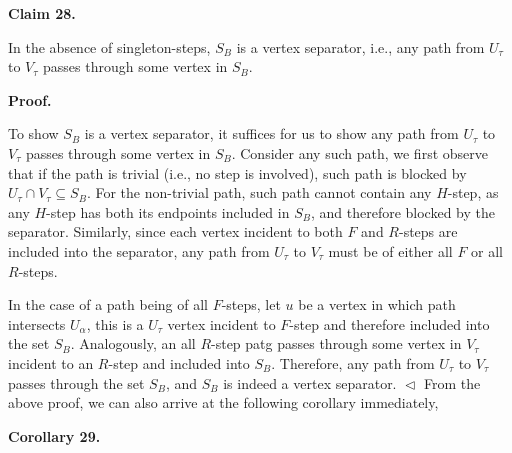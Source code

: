 

\par\medskip\noindent\textbf{
Claim 28. 
}\par



In the absence of singleton-steps, $S_{B}$ is a vertex separator, i.e., any path from $U_{\tau}$ to $V_{\tau}$ passes through some vertex in $S_{B}$.\par






\par\medskip\noindent\textbf{
\textbf{Proof}.}\par




To show $S_{B}$ is a vertex separator, it suffices for us to show any path from $U_{\tau}$ to $V_{\tau}$ passes through some vertex in $S_{B}$.
Consider any such path, we first observe that if the path is trivial (i.e., no step is involved), such path is blocked by $U_{\tau}\cap V_{\tau}\subseteq S_{B}$. For the non-trivial path, such path cannot contain any $H$-step, as any $H$-step has both its endpoints included in $S_{B}$, and therefore blocked by the separator. Similarly, since each vertex incident to both $F$ and $R$-steps are included into the separator, any path from $U_{\tau}$ to $V_{\tau}$ must be of either all $F$ or all $R$-steps.\par




In the case of a path being of all $F$-steps, let $u$ be a vertex in which path intersects $U_{\alpha}$, this is a $U_{\tau}$ vertex incident to $F$-step and therefore included into the set $S_{B}$. Analogously, an all $R$-step patg passes through some vertex in $V_{\tau}$ incident to an $R$-step and included into $S_{B}$. Therefore, any path from $U_{\tau}$ to $V_{\tau}$ passes through the set $S_{B}$, and $S_{B}$ is indeed a vertex separator.
$\vartriangleleft$
From the above proof, we can also arrive at the following corollary immediately,\par





\par\medskip\noindent\textbf{
\textbf{Corollary 29}\textbf{.}
}\par



